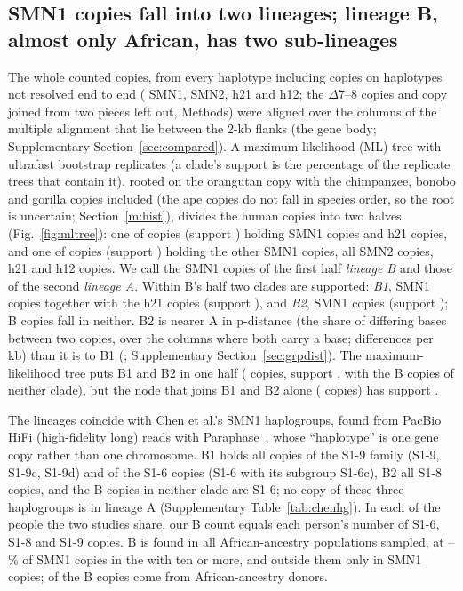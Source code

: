 \documentclass[10pt]{article}
\begin{document}
\subsection{SMN1 copies fall into two lineages; lineage B, almost only African, has two sub-lineages}\label{m:lineages}
The \nCopies{} whole counted copies, from every haplotype including \nCopiesUnres{} copies on \nCopiesUnresHaps{} haplotypes not resolved end to end (\nSMNone{} SMN1, \nSMNtwo{} SMN2, \nHtwentyone{} h21 and \nHtwelve{} h12; the
\nDelLeftOut{} $\Delta$7--8 copies and \nJoined{} copy joined from two pieces left out, Methods) were aligned over the \nGeneCols{} columns of the multiple alignment
that lie between the 2-kb flanks (the gene body; Supplementary Section~\ref{sec:compared}). A maximum-likelihood (ML) tree
with \iqBoot{} ultrafast bootstrap replicates (a clade's support is the percentage of the \iqBoot{} replicate trees that contain it), rooted on the orangutan copy with the chimpanzee, bonobo and gorilla copies
included (the ape copies do not fall in species order, so the root is uncertain; Section~\ref{m:hist}), divides the human copies into two halves (Fig.~\ref{fig:mltree}): one of \mlIcopies{} copies (support
\mlIsup) holding \mlIB{} SMN1 copies and \mlIh{} h21 copies, and one of \mlIIcopies{} copies (support \mlIIsup)
holding the other \mlIIA{} SMN1 copies, all \mlIISMNtwo{} SMN2 copies, \mlIIh{} h21 and \mlIIhtwelve{} h12 copies. We
call the SMN1 copies of the first half \emph{lineage B} and those of the second \emph{lineage A}. Within B's half two
clades are supported: \emph{B1}, \linBone{} SMN1 copies together with the \mlBhH{} h21 copies (support \mlBhSup), and
\emph{B2}, \linBtwo{} SMN1 copies (support \mlEightSup); \linBnone{} B copies fall in neither. B2 is nearer A in p-distance (the share of differing bases between two copies, over the columns where both carry a base; \gsABtwo{} differences per kb) than it is to B1 (\gsBoneBtwo; Supplementary Section~\ref{sec:grpdist}). The maximum-likelihood tree puts B1 and B2 in one half (\mlIcopies{} copies, support \mlIsup, with the \linBnone{} B copies of neither clade), but the node that joins B1 and B2 alone (\mlBBjoinCopies{} copies) has support \mlBBjoinSup.

The lineages coincide with Chen et al.'s SMN1 haplogroups, found from PacBio HiFi (high-fidelity long) reads with Paraphase~\cite{chen2023}, whose
``haplotype'' is one gene copy rather than one chromosome. B1 holds all \hgNineB{} copies of the S1-9 family (S1-9,
S1-9c, S1-9d) and \hgBoneSix{} of the \hgSixB{} S1-6 copies (S1-6 with its subgroup S1-6c), B2 all \hgEightB{} S1-8 copies, and the \hgBnoneSix{} B
copies in neither clade are S1-6; no copy of these three haplogroups is in lineage A (Supplementary
Table~\ref{tab:chenhg}). In each of the \hgPeople{} people the two studies share, our B count equals each person's
number of S1-6, S1-8 and S1-9 copies. B is found in all \ldAfrPopsB{} African-ancestry populations sampled, at
\ldShareMin--\ldShareMax\% of SMN1 copies in the \ldAfrPopsBig{} with ten or more, and outside them only in
\linBNonAfrPops{} SMN1 copies; \linBAfr{} of the \linB{} B copies come from African-ancestry donors.
\end{document}
